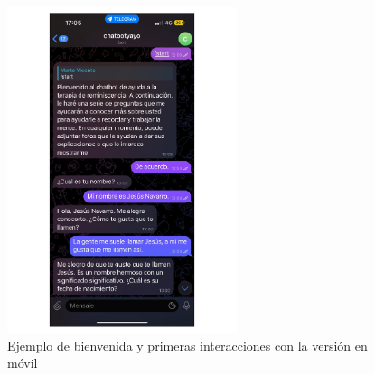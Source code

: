 \begin{figure}[h]
	\centering
	\includegraphics[width=0.6\textwidth]{Imagenes/bienvenidaMovil}
	\caption{Ejemplo de bienvenida y primeras interacciones con la versión en móvil}
	\label{fig:bienvenidaMovil}
\end{figure}



